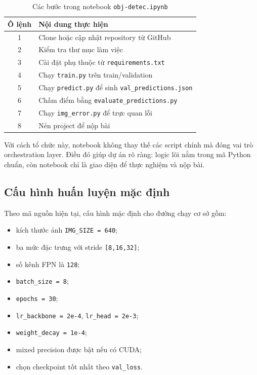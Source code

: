 \documentclass[12pt,a4paper]{article}
\begin{document}
\begin{table}[H]
\centering
\caption{Các bước trong notebook \texttt{obj-detec.ipynb}}
\label{tab:notebook}
\begin{tabular}{cl}
\toprule
Ô lệnh & Nội dung thực hiện \\
\midrule
1 & Clone hoặc cập nhật repository từ GitHub \\
2 & Kiểm tra thư mục làm việc \\
3 & Cài đặt phụ thuộc từ \texttt{requirements.txt} \\
4 & Chạy \texttt{train.py} trên train/validation \\
5 & Chạy \texttt{predict.py} để sinh \texttt{val\_predictions.json} \\
6 & Chấm điểm bằng \texttt{evaluate\_predictions.py} \\
7 & Chạy \texttt{img\_error.py} để trực quan lỗi \\
8 & Nén project để nộp bài \\
\bottomrule
\end{tabular}
\end{table}

Với cách tổ chức này, notebook không thay thế các script chính mà đóng vai trò orchestration layer. Điều đó giúp dự án rõ ràng: logic lõi nằm trong mã Python chuẩn, còn notebook chỉ là giao diện để thực nghiệm và nộp bài.

\subsection{Cấu hình huấn luyện mặc định}
Theo mã nguồn hiện tại, cấu hình mặc định cho đường chạy cơ sở gồm:
\begin{itemize}
    \item kích thước ảnh \texttt{IMG\_SIZE = 640};
    \item ba mức đặc trưng với stride \texttt{[8,16,32]};
    \item số kênh FPN là \texttt{128};
    \item \texttt{batch\_size = 8};
    \item \texttt{epochs = 30};
    \item \texttt{lr\_backbone = 2e-4}, \texttt{lr\_head = 2e-3};
    \item \texttt{weight\_decay = 1e-4};
    \item mixed precision được bật nếu có CUDA;
    \item chọn checkpoint tốt nhất theo \texttt{val\_loss}.
\end{itemize}
\end{document}
